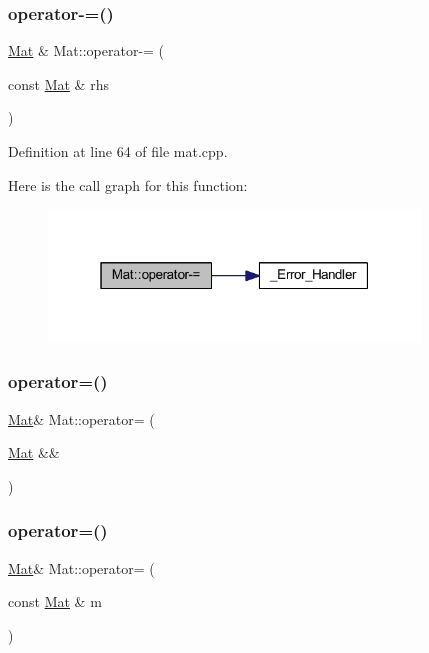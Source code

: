 \subsubsection{\texorpdfstring{operator-\/=()}{operator-=()}}
{\footnotesize\ttfamily \mbox{\hyperlink{class_mat}{Mat}} \& Mat\+::operator-\/= (\begin{DoxyParamCaption}\item[{const \mbox{\hyperlink{class_mat}{Mat}} \&}]{rhs }\end{DoxyParamCaption})}



Definition at line 64 of file mat.\+cpp.

Here is the call graph for this function\+:
\nopagebreak
\begin{figure}[H]
\begin{center}
\leavevmode
\includegraphics[width=280pt]{class_mat_a2bb1e2bbfba19148a87b67288ed7fc91_cgraph}
\end{center}
\end{figure}
\mbox{\label{class_mat_aa0e4a30b4d5a71e6c3cc780fabeca136}} 
\subsubsection{\texorpdfstring{operator=()}{operator=()}\hspace{0.1cm}{\footnotesize\ttfamily [1/2]}}
{\footnotesize\ttfamily \mbox{\hyperlink{class_mat}{Mat}}\& Mat\+::operator= (\begin{DoxyParamCaption}\item[{\mbox{\hyperlink{class_mat}{Mat}} \&\&}]{ }\end{DoxyParamCaption})\hspace{0.3cm}{\ttfamily [default]}}

\mbox{\label{class_mat_ae66f73e282cd9134c4677b33f964c575}} 
\subsubsection{\texorpdfstring{operator=()}{operator=()}\hspace{0.1cm}{\footnotesize\ttfamily [2/2]}}
{\footnotesize\ttfamily \mbox{\hyperlink{class_mat}{Mat}}\& Mat\+::operator= (\begin{DoxyParamCaption}\item[{const \mbox{\hyperlink{class_mat}{Mat}} \&}]{m }\end{DoxyParamCaption})\hspace{0.3cm}{\ttfamily [inline]}}



